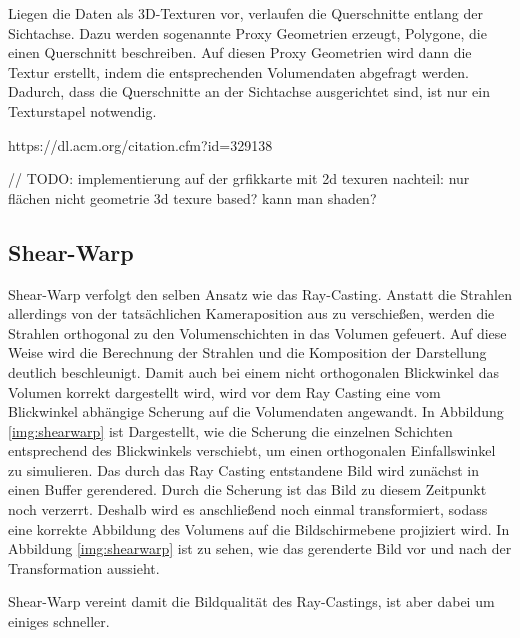 Liegen die Daten als 3D-Texturen vor, verlaufen die Querschnitte entlang der Sichtachse. Dazu werden sogenannte Proxy Geometrien erzeugt, Polygone, die einen Querschnitt beschreiben. Auf diesen Proxy Geometrien wird dann die Textur erstellt, indem die entsprechenden Volumendaten abgefragt werden. Dadurch, dass die Querschnitte an der Sichtachse ausgerichtet sind, ist nur ein Texturstapel notwendig. 


https://dl.acm.org/citation.cfm?id=329138

// TODO:
implementierung auf der grfikkarte mit 2d texuren nachteil: nur flächen nicht geometrie
3d texure based? 	
kann man shaden?

\subsection{Shear-Warp}

Shear-Warp verfolgt den selben Ansatz wie das Ray-Casting. Anstatt die Strahlen allerdings von der tatsächlichen Kameraposition aus zu verschießen, werden die Strahlen orthogonal zu den Volumenschichten in das Volumen gefeuert. Auf diese Weise wird die Berechnung der Strahlen und die Komposition der Darstellung deutlich beschleunigt. 
Damit auch bei einem nicht orthogonalen Blickwinkel das Volumen korrekt dargestellt wird, wird vor dem Ray Casting eine vom Blickwinkel abhängige Scherung auf die Volumendaten angewandt. In Abbildung \ref{img:shearwarp} ist Dargestellt, wie die Scherung die einzelnen Schichten entsprechend des Blickwinkels verschiebt, um einen orthogonalen Einfallswinkel zu simulieren. 
Das durch das Ray Casting entstandene Bild wird zunächst in einen Buffer gerendered. Durch die Scherung ist das Bild zu diesem Zeitpunkt noch verzerrt. Deshalb wird es anschließend noch einmal transformiert, sodass eine korrekte Abbildung des Volumens auf die Bildschirmebene projiziert wird. In Abbildung \ref{img:shearwarp} ist zu sehen, wie das gerenderte Bild vor und nach der Transformation aussieht. 

Shear-Warp vereint damit die Bildqualität des Ray-Castings, ist aber dabei um einiges schneller.

